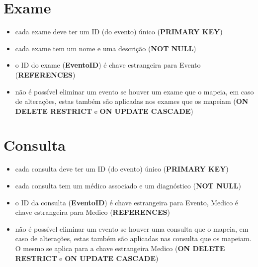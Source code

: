 \documentclass[article, a4paper, 12pt, oneside]{memoir}
\begin{document}
\section*{Exame}
\begin{itemize}
	\item cada exame deve ter um ID (do evento) único (\textbf{PRIMARY KEY})
	\item cada exame tem um nome e uma descrição (\textbf{NOT NULL})
	\item o ID do exame (\textbf{EventoID}) é chave estrangeira para Evento (\textbf{REFERENCES})
	\item não é possível eliminar um evento se houver um exame que o mapeia, em caso de alterações, estas também são aplicadas nos exames que os mapeiam (\textbf{ON DELETE RESTRICT} e \textbf{ON UPDATE CASCADE})
\end{itemize}

\section*{Consulta}
\begin{itemize}
	\item cada consulta deve ter um ID (do evento) único (\textbf{PRIMARY KEY})
	\item cada consulta tem um médico associado e um diagnóstico (\textbf{NOT NULL})
	\item o ID da consulta (\textbf{EventoID}) é chave estrangeira para Evento, Medico é chave estrangeira para Medico (\textbf{REFERENCES})
	\item não é possível eliminar um evento se houver uma consulta que o mapeia, em caso de alterações, estas também são aplicadas nas consulta que os mapeiam. O mesmo se aplica para a chave estrangeira Medico (\textbf{ON DELETE RESTRICT} e \textbf{ON UPDATE CASCADE})
\end{itemize}
\end{document}
